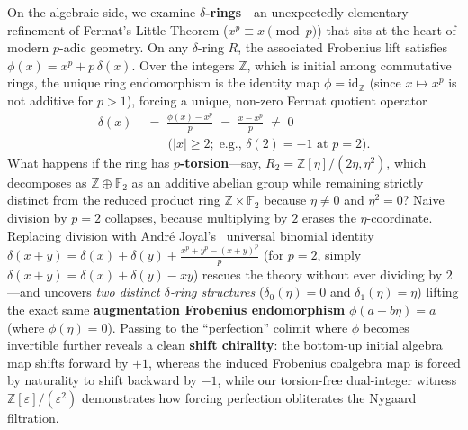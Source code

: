 \documentclass[10pt,twoside,openright]{book}
\theoremstyle{crmplain}
\theoremstyle{crmdef}
\theoremstyle{crmremark}
\begin{document}
On the algebraic side, we examine \textbf{$\delta$-rings}---an unexpectedly elementary refinement of Fermat's Little Theorem ($x^p \equiv x \pmod p$) that sits at the heart of modern $p$-adic geometry. On any $\delta$-ring $R$, the associated Frobenius lift satisfies $\phi(x) = x^p + p\,\delta(x)$. Over the integers $\mathbb{Z}$, which is initial among commutative rings, the unique ring endomorphism is the identity map $\phi = \mathrm{id}_{\mathbb{Z}}$ (since $x \mapsto x^p$ is not additive for $p > 1$), forcing a unique, non-zero Fermat quotient operator
\[
  \begin{aligned}
    \delta(x) &\;=\; \frac{\phi(x) - x^p}{p} \;=\; \frac{x - x^p}{p} \;\neq\; 0 \\
    &\qquad \bigl(|x| \ge 2;\; \text{e.g., } \delta(2) = -1 \text{ at } p = 2\bigr).
  \end{aligned}
\]
What happens if the ring has \textbf{$p$-torsion}---say, $R_2 = \mathbb{Z}[\eta]/(2\eta, \eta^2)$, which decomposes as $\mathbb{Z} \oplus \mathbb{F}_2$ as an additive abelian group while remaining strictly distinct from the reduced product ring $\mathbb{Z} \times \mathbb{F}_2$ because $\eta \neq 0$ and $\eta^2 = 0$? Naive division by $p = 2$ collapses, because multiplying by $2$ erases the $\eta$-coordinate. Replacing division with Andr\'e Joyal's~\cite{Joyal85} universal binomial identity $\delta(x + y) = \delta(x) + \delta(y) + \frac{x^p + y^p - (x+y)^p}{p}$ (for $p = 2$, simply $\delta(x+y) = \delta(x) + \delta(y) - xy$) rescues the theory without ever dividing by $2$---and uncovers \emph{two distinct $\delta$-ring structures} ($\delta_0(\eta) = 0$ and $\delta_1(\eta) = \eta$) lifting the exact same \textbf{augmentation Frobenius endomorphism} $\phi(a + b\eta) = a$ (where $\phi(\eta) = 0$). Passing to the ``perfection'' colimit where $\phi$ becomes invertible further reveals a clean \textbf{shift chirality}: the bottom-up initial algebra map shifts forward by $+1$, whereas the induced Frobenius coalgebra map is forced by naturality to shift backward by $-1$, while our torsion-free dual-integer witness $\mathbb{Z}[\varepsilon]/(\varepsilon^2)$ demonstrates how forcing perfection obliterates the Nygaard filtration.
\end{document}
